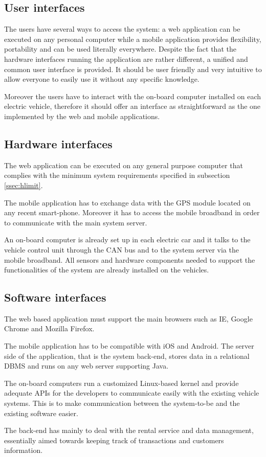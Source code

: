 \subsection{User interfaces}
The users have several ways to access the system: a web application can be executed on any personal computer while a mobile application provides flexibility, portability and can be used literally everywhere. Despite the fact that the hardware interfaces running the application are rather different, a unified and common user interface is provided. It should be user friendly and very intuitive to allow everyone to easily use it without any specific knowledge.

Moreover the users have to interact with the on-board computer installed on each electric vehicle, therefore it should offer an interface as straightforward as the one implemented by the web and mobile applications.

\subsection{Hardware interfaces}
The web application can be executed on any general purpose computer that complies with the minimum system requirements specified in subsection \ref{ssec:hlimit}.

The mobile application has to exchange data with the GPS module located on any recent smart-phone. Moreover it has to access the mobile broadband in order to communicate with the main system server.

An on-board computer is already set up in each electric car and it talks to the vehicle control unit through the CAN bus and to the system server via the mobile broadband. All sensors and hardware components needed to support the functionalities of the system are already installed on the vehicles.

\subsection{Software interfaces}
The web based application must support the main browsers such as IE, Google Chrome and Mozilla Firefox.

The mobile application has to be compatible with iOS and Android. The server side of the application, that is the system back-end, stores data in a relational DBMS and runs on any web server supporting Java.

The on-board computers run a customized Linux-based kernel and provide adequate APIs for the developers to communicate easily with the existing vehicle systems. This is to make communication between the system-to-be and the existing software easier.

The back-end has mainly to deal with the rental service and data management, essentially aimed towards keeping track of transactions and customers information.
